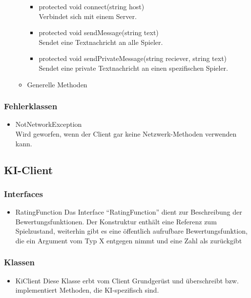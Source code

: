 \documentclass[a4paper,10pt]{article}
\begin{document}
\begin{itemize}
\begin{itemize}
\begin{itemize}
\item protected void connect(string host) \\
Verbindet sich mit einem Server.
\item protected void sendMessage(string text) \\
Sendet eine Textnachricht an alle Spieler.
\item protected void sendPrivateMessage(string reciever, string text) \\
Sendet eine private Textnachricht an einen spezifischen Spieler.
\end{itemize} %
\item Generelle Methoden
\end{itemize} %
\end{itemize} %
\subsubsection{Fehlerklassen}
\begin{itemize}
\item NotNetworkException \\
Wird geworfen, wenn der Client gar keine Netzwerk-Methoden verwenden kann.
\end{itemize} %

\subsection{KI-Client}
\subsubsection{Interfaces}
\begin{itemize}
\item RatingFunction
Das Interface "`RatingFunction"' dient zur Beschreibung der Bewertungsfunktionen. Der Konstruktur enthält eine Referenz zum Spielzustand, weiterhin gibt es eine öffentlich aufrufbare Bewertungsfunktion, die ein Argument vom Typ X entgegen nimmt und eine Zahl als zurückgibt
\end{itemize}
\subsubsection{Klassen}
\begin{itemize}
\item KiClient
Diese Klasse erbt vom Client Grundgerüst und überschreibt bzw. implementiert Methoden, die KI-spezifisch sind.
\end{itemize}
\end{document}
